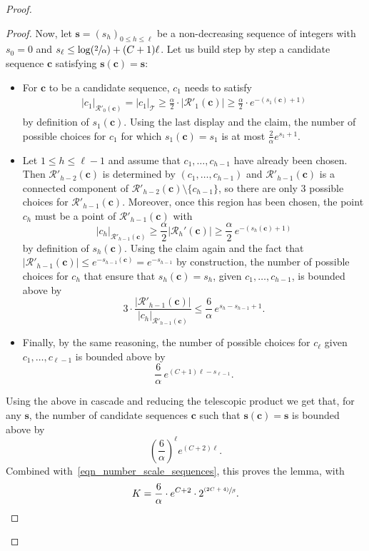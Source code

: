 \documentclass[11pt]{article}
\let\backslash\setminus
\newcommand{\Psfrac}[2]{(\sfrac{#1}{#2})}
\newcommand{\psfrac}[2]{\sfrac{(#1)}{#2}}
\newcommand{\Tt}{\mathcal{T}}
\newcommand{\Rr}{\mathcal{R}}
\theoremstyle{plain}
\theoremstyle{definition}
\numberwithin{equation}{section}
\begin{document}
\begin{proof}
\begin{proof}
Now, let $\mathbf{s}=(s_h)_{0 \leq h \leq \ell}$ be a non-decreasing sequence of integers with $s_0=0$ and $s_{\ell} \leq \log \Psfrac{2}{\alpha} +(C+1)\ell$.
Let us build step by step a candidate sequence $\mathbf{c}$ satisfying $\mathbf{s}(\mathbf{c})=\mathbf{s}$:
\begin{itemize}
\item For $\mathbf{c}$ to be a candidate sequence, $c_1$ needs to satisfy
\begin{align*}
|c_1|_{\Rr'_{0}(\mathbf{c})}=|c_1|_{\Tt} \geq \frac{\alpha}{2}\cdot |\Rr'_{1}(\mathbf{c})| \geq \frac{\alpha}{2}\cdot e^{-(s_1(\mathbf{c})+1)}
\end{align*}
by definition of $s_1(\mathbf{c})$.
Using the last display and the claim, the number of possible choices for $c_1$ for which $s_1(\mathbf{c})=s_1$ is at most $\frac{2}{\alpha} e^{s_1+1}$.
\item Let $1 \leq h \leq \ell-1$ and assume that $c_1, \dots, c_{h-1}$ have already been chosen.
Then $\Rr'_{h-2}(\mathbf{c})$ is determined by $(c_1, \dots, c_{h-1})$ and $\Rr'_{h-1}(\mathbf{c})$ is a connected component of $\Rr'_{h-2}(\mathbf{c}) \backslash \{ c_{h-1} \}$, so there are only $3$ possible choices for $\Rr'_{h-1}(\mathbf{c})$.
Moreover, once this region has been chosen, the point $c_h$ must be a point of $\Rr'_{h-1}(\mathbf{c})$ with
\[
|c_h|_{\Rr'_{h-1}(\mathbf{c})} \geq \frac{\alpha}{2} \left| \Rr_h'(\mathbf{c}) \right| \geq \frac{\alpha}{2}\, e^{-(s_h(\mathbf{c})+1)}
\]
by definition of $s_h(\mathbf{c})$.
Using the claim again and the fact that $|\Rr'_{h-1}(\mathbf{c})| \leq e^{-s_{h-1}(\mathbf{c})}=e^{-s_{h-1}}$ by construction,
the number of possible choices for $c_h$ that ensure that \hbox{$s_h(\mathbf{c})=s_h$}, given $c_1, \dots, c_{h-1}$, is bounded above by
\[
3 \cdot \frac{\left| \Rr'_{h-1}(\mathbf{c}) \right|}{|c_h|_{\Rr'_{h-1}(\mathbf{c})}} \leq \frac{6}{\alpha}\, e^{s_h-s_{h-1}+1}.
\]
\item Finally, by the same reasoning, the number of possible choices for $c_{\ell}$ given $c_1, \dots, c_{\ell-1}$ is bounded above by
\[ \frac{6}{\alpha}\, e^{(C+1)\ell-s_{\ell-1}}.\]
\end{itemize}
Using the above in cascade and reducing the telescopic product we get that, for any $\mathbf{s}$, the number of candidate sequences $\mathbf{c}$ such that $\mathbf{s}(\mathbf{c})=\mathbf{s}$ is bounded above by
\[
\left( \frac{6}{\alpha} \right)^{\ell} e^{(C+2)\ell}.
\]
Combined with~\eqref{eqn_number_scale_sequences}, this proves the lemma, with
\begin{equation}\label{eq:formula for K}
K=\frac{6}{\alpha} \cdot e^{C+2} \cdot 2^{\psfrac{2C+4}{\beta}}.\qedhere
\end{equation}
\end{proof}


\end{proof}
\end{document}

